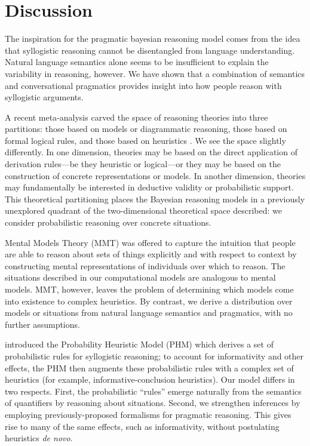 \documentclass[10pt,letterpaper]{article}
\begin{document}
\section{Discussion}

The inspiration for the pragmatic bayesian reasoning model comes from the idea that syllogistic reasoning cannot be disentangled from language understanding. Natural language semantics alone seems to be insufficient to explain the variability in reasoning, however. We have shown that a combination of semantics and conversational pragmatics provides insight into how people reason with syllogistic arguments. 

A recent meta-analysis carved the space of reasoning theories into three partitions: those based on models or diagrammatic reasoning, those based on formal logical rules, and those based on heuristics \cite{Khemlani2012}. We see the space slightly differently. In one dimension, theories may be based on the direct application of derivation rules---be they heuristic or logical---or they may be based on the construction of concrete representations or models. In another dimension, theories may fundamentally be interested in deductive validity or probabilistic support. This theoretical partitioning places the Bayesian reasoning models in a previously unexplored quadrant of the two-dimensional theoretical space described: we consider probabilistic reasoning over concrete situations.

Mental Models Theory (MMT) was offered to capture the intuition that people are able to reason about sets of things explicitly and with respect to context by constructing mental representations of individuals over which to reason. The situations described in our computational models are analogous to mental models. MMT, however, leaves the problem of determining which models come into existence to complex heuristics. By contrast, we derive a distribution over models or situations from natural language semantics and pragmatics, with no further assumptions.


 introduced the Probability Heuristic Model (PHM) which derives a set of probabilistic rules for syllogistic reasoning; to account for informativity and other effects, the PHM then augments these probabilistic rules with a complex set of heuristics (for example, informative-conclusion heuristics). Our model differs in two respects. First, the probabilistic ``rules'' emerge naturally from the semantics of quantifiers by reasoning about situations. Second, we strengthen inferences by employing previously-proposed formalisms for pragmatic reasoning. This gives rise to many of the same effects, such as informativity, without postulating heuristics \emph{de novo}.
\end{document}
